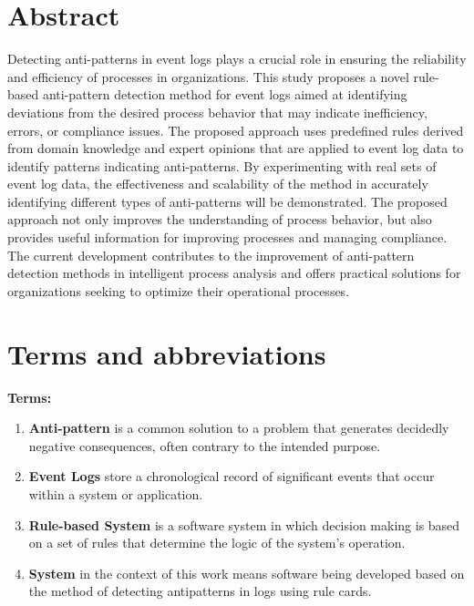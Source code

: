 \documentclass[12pt, times]{article}
\begin{document}
	\clearpage
	

\setcounter{tocdepth}{3}
\tableofcontents
\thispagestyle{empty}
\clearpage



\section*{Abstract}
		\hspace{5mm}Detecting anti-patterns \cite{antipattern} in event logs \cite{event_logs} plays a crucial role in ensuring the reliability and efficiency of processes in organizations. This study proposes a novel rule-based \cite{rule} anti-pattern detection method for event logs aimed at identifying deviations from the desired process behavior that may indicate inefficiency, errors, or compliance issues. The proposed approach uses predefined rules derived from domain knowledge and expert opinions that are applied to event log data to identify patterns indicating anti-patterns. By experimenting with real sets of event log data, the effectiveness and scalability of the method in accurately identifying different types of anti-patterns will be demonstrated. The proposed approach not only improves the understanding of process behavior, but also provides useful information for improving processes and managing compliance.  The current development contributes to the improvement of anti-pattern detection methods in intelligent process analysis and offers practical solutions for organizations seeking to optimize their operational processes.
\clearpage

\section*{Terms and abbreviations}
		\textbf{Terms:}
		\begin{enumerate}
			\item \textbf{Anti-pattern} is a common solution to a problem that generates decidedly negative consequences, often contrary to the intended purpose.
			\item \textbf{Event Logs} store a chronological record of significant events that occur within a system or application.
			\item\textbf{Rule-based System} is a software system in which decision making is based on a set of rules that determine the logic of the system's operation.
			\item\textbf{System} in the context of this work means software being developed based on the method of detecting antipatterns in logs using rule cards.
		\end{enumerate}
		
\end{document}
